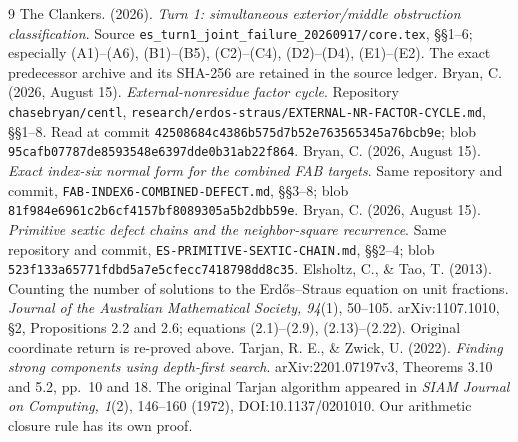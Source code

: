 \begin{thebibliography}{9}
 The Clankers. (2026). \emph{Turn 1: simultaneous exterior/middle
obstruction classification}. Source \texttt{es\_turn1\_joint\_failure\_20260917/core.tex},
\S\S1--6; especially (A1)--(A6), (B1)--(B5), (C2)--(C4), (D2)--(D4), (E1)--(E2).
The exact predecessor archive and its SHA-256 are retained in the source ledger.
 Bryan, C. (2026, August 15).
\emph{External-nonresidue factor cycle}. Repository \texttt{chasebryan/centl},
\texttt{research/erdos-straus/EXTERNAL-NR-FACTOR-CYCLE.md}, \S\S1--8.
Read at commit \texttt{42508684c4386b575d7b52e763565345a76bcb9e};
blob \texttt{95cafb07787de8593548e6397dde0b31ab22f864}.
 Bryan, C. (2026, August 15).
\emph{Exact index-six normal form for the combined FAB targets}.
Same repository and commit, \texttt{FAB-INDEX6-COMBINED-DEFECT.md}, \S\S3--8;
blob \texttt{81f984e6961c2b6cf4157bf8089305a5b2dbb59e}.
 Bryan, C. (2026, August 15).
\emph{Primitive sextic defect chains and the neighbor-square recurrence}.
Same repository and commit, \texttt{ES-PRIMITIVE-SEXTIC-CHAIN.md}, \S\S2--4;
blob \texttt{523f133a65771fdbd5a7e5cfecc7418798dd8c35}.
 Elsholtz, C., \& Tao, T. (2013). Counting the number of solutions
to the Erd\H{o}s--Straus equation on unit fractions.
\emph{Journal of the Australian Mathematical Society, 94}(1), 50--105.
arXiv:1107.1010, \S2, Propositions 2.2 and 2.6; equations (2.1)--(2.9),
(2.13)--(2.22). Original coordinate return is re-proved above.
 Tarjan, R. E., \& Zwick, U. (2022).
\emph{Finding strong components using depth-first search}.
arXiv:2201.07197v3, Theorems 3.10 and 5.2, pp.~10 and 18.
The original Tarjan algorithm appeared in \emph{SIAM Journal on Computing, 1}(2),
146--160 (1972), DOI:10.1137/0201010. Our arithmetic closure rule has its own proof.
\end{thebibliography}
